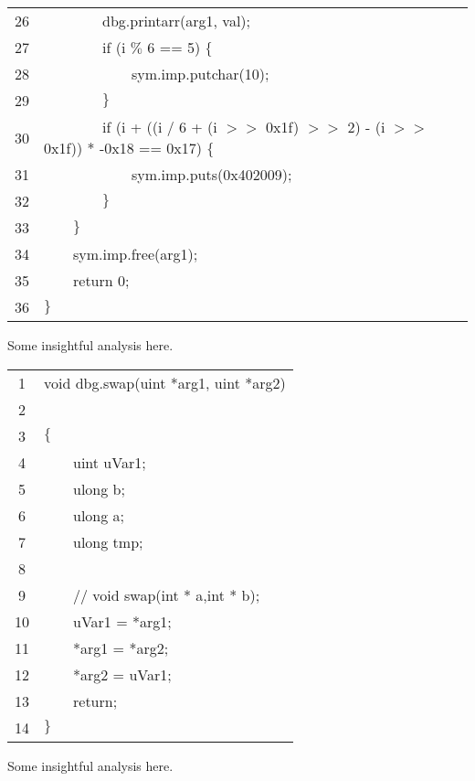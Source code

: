 \documentclass{report}
\newcommand{\tab}{$\quad$}
\newcommand{\biigs}{\par\bigskip}
\newcommand{\csfont}[1]{\fontfamily{cmtt}\selectfont #1}
\begin{document}
\begin{tabular}{c|l}
    26 & {\csfont{\tab \tab \tab \tab dbg.printarr(arg1, val);}} \\
    27 & {\csfont{\tab \tab \tab \tab if (i $\%$ 6 == 5) $\{$}} \\
    28 & {\csfont{\tab \tab \tab \tab \tab \tab sym.imp.putchar(10);}} \\
    29 & {\csfont{\tab \tab \tab \tab $\}$}} \\
    30 & {\csfont{\tab \tab \tab \tab if (i + ((i / 6 + (i $>$$>$ 0x1f) $>$$>$ 2) - (i $>$$>$ 0x1f)) * -0x18 == 0x17) $\{$}} \\
    31 & {\csfont{\tab \tab \tab \tab \tab \tab sym.imp.puts(0x402009);}} \\
    32 & {\csfont{\tab \tab \tab \tab $\}$}} \\
    33 & {\csfont{\tab \tab $\}$}} \\
    34 & {\csfont{\tab \tab sym.imp.free(arg1);}} \\
    35 & {\csfont{\tab \tab return 0;}} \\
    36 & {\csfont{$\}$}} \\
    \hline
  \end{tabular}
  \biigs
  Some insightful analysis here.
  \biigs
  \begin{tabular}{c|l}
    \hline
    1 & {\csfont{void dbg.swap(uint *arg1, uint *arg2)}} \\
    2 & {\csfont{}} \\
    3 & {\csfont{$\{$}} \\
    4 & {\csfont{\tab \tab uint uVar1;}} \\
    5 & {\csfont{\tab \tab ulong b;}} \\
    6 & {\csfont{\tab \tab ulong a;}} \\
    7 & {\csfont{\tab \tab ulong tmp;}} \\
    8 & {\csfont{\tab \tab }} \\
    9 & {\csfont{\tab \tab // void swap(int * a,int * b);}} \\
    10 & {\csfont{\tab \tab uVar1 = *arg1;}} \\
    11 & {\csfont{\tab \tab *arg1 = *arg2;}} \\
    12 & {\csfont{\tab \tab *arg2 = uVar1;}} \\
    13 & {\csfont{\tab \tab return;}} \\
    14 & {\csfont{$\}$}} \\
    \hline
  \end{tabular}
  \biigs
  Some insightful analysis here.
  \biigs
\end{document}
